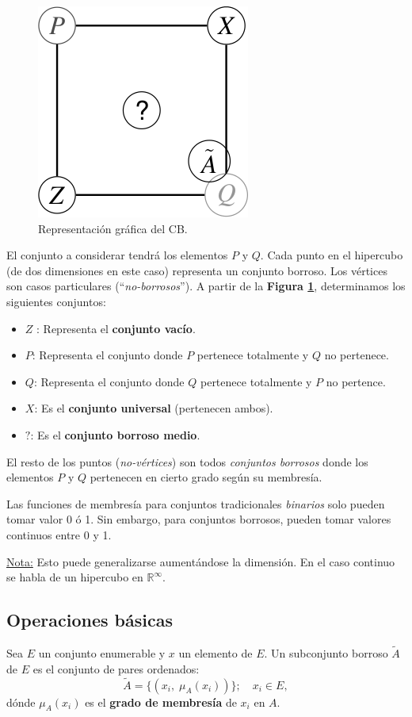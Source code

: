 \documentclass[10pt,a4paper]{article}
\begin{document}
\begin{figure}
  \caption{Representación gráfica del CB.}
  \label{fig:fuzzy_square}
  \centerline{\includegraphics[width=0.16\textwidth-\fboxrule-\fboxrule]{imgs/fuzzy_square.png}}
\end{figure}

El conjunto a considerar tendrá los elementos $P$ y $Q$. Cada punto en el hipercubo (de dos dimensiones en este caso) representa un conjunto borroso. Los vértices son casos particulares (``\textit{no-borrosos}''). A partir de la \textbf{Figura \ref{fig:fuzzy_square}}, determinamos los siguientes conjuntos:
\begin{itemize}
\item $Z$ : Representa el \textbf{conjunto vacío}.
\item $P$: Representa el conjunto donde $P$ pertenece totalmente y $Q$ no pertenece.
\item $Q$: Representa el conjunto donde $Q$ pertenece totalmente y $P$ no pertence.
\item $X$: Es el \textbf{conjunto universal} (pertenecen ambos).
\item $?$: Es el \textbf{conjunto borroso medio}.
\end{itemize}

El resto de los puntos (\textit{no-vértices}) son todos \textit{conjuntos borrosos} donde los elementos $P$ y $Q$ pertenecen en cierto grado según su membresía.

Las funciones de membresía para conjuntos tradicionales \textit{binarios} solo pueden tomar valor 0 ó 1. Sin embargo, para conjuntos borrosos, pueden tomar valores continuos entre 0 y 1.

\underline{Nota:} Esto puede generalizarse aumentándose la dimensión. En el caso continuo se habla de un hipercubo en $\mathbb{R}^\infty$.\\
\linebreak
\subsection{Operaciones básicas}

Sea $E$ un conjunto enumerable y $x$ un elemento de $E$. Un subconjunto borroso $\tilde{A}$ de $E$ es el conjunto de pares ordenados:
\[
\tilde{A} = \{(x_i, \; \mu_A(x_i))\}; \quad x_i \in E,
\]
dónde $\mu_A(x_i)$ es el \textbf{grado de membresía} de $x_i$ en $A$.
\end{document}
